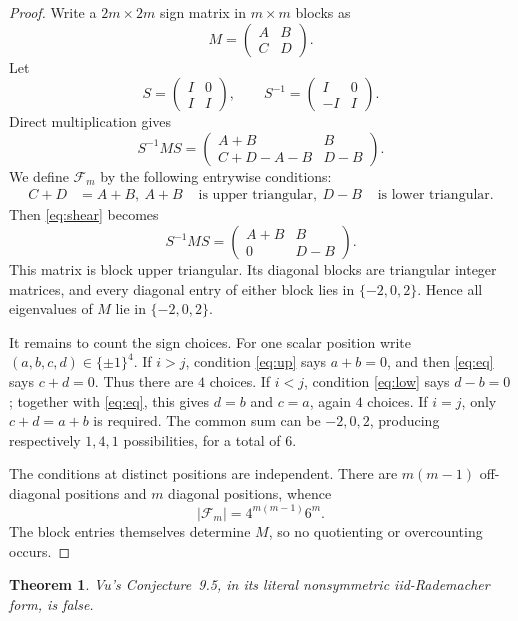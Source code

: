 \documentclass[11pt]{article}
\newtheorem{theorem}{Theorem}
\begin{document}
\begin{proof}
Write a $2m\times2m$ sign matrix in $m\times m$ blocks as
\[
M=\begin{pmatrix}A&B\\ C&D\end{pmatrix}.
\]
Let
\[
S=\begin{pmatrix}I&0\\ I&I\end{pmatrix},\qquad
S^{-1}=\begin{pmatrix}I&0\\ -I&I\end{pmatrix}.
\]
Direct multiplication gives
\begin{equation}\label{eq:shear}
S^{-1}MS=
\begin{pmatrix}
A+B&B\\
C+D-A-B&D-B
\end{pmatrix}.
\end{equation}
We define $\mathcal F_m$ by the following entrywise conditions:
\begin{align}
C+D&=A+B,\label{eq:eq}\
A+B&\text{ is upper triangular},\label{eq:up}\
D-B&\text{ is lower triangular}.\label{eq:low}
\end{align}
Then \eqref{eq:shear} becomes
\[
S^{-1}MS=
\begin{pmatrix}
A+B&B\\0&D-B
\end{pmatrix}.
\]
This matrix is block upper triangular.  Its diagonal blocks are triangular integer matrices, and every diagonal entry of either block lies in $\{-2,0,2\}$.  Hence all eigenvalues of $M$ lie in $\{-2,0,2\}$.

It remains to count the sign choices.  For one scalar position write $(a,b,c,d)\in\{\pm1\}^4$.
If $i>j$, condition \eqref{eq:up} says $a+b=0$, and then \eqref{eq:eq} says $c+d=0$.  Thus there are $4$ choices.
If $i<j$, condition \eqref{eq:low} says $d-b=0$; together with \eqref{eq:eq}, this gives $d=b$ and $c=a$, again $4$ choices.
If $i=j$, only $c+d=a+b$ is required.  The common sum can be $-2,0,2$, producing respectively $1,4,1$ possibilities, for a total of $6$.

The conditions at distinct positions are independent.  There are $m(m-1)$ off-diagonal positions and $m$ diagonal positions, whence
\[
|\mathcal F_m|=4^{m(m-1)}6^m.
\]
The block entries themselves determine $M$, so no quotienting or overcounting occurs.
\end{proof}

\begin{theorem}\label{thm:refute}
Vu's Conjecture~9.5, in its literal nonsymmetric iid-Rademacher form, is false.
\end{theorem}
\end{document}
